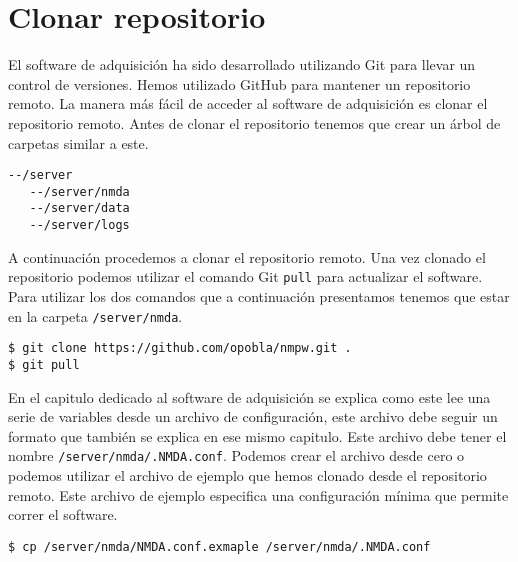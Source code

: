 	\section{Clonar repositorio}
		El software de adquisición ha sido desarrollado utilizando Git para llevar un control de versiones. Hemos utilizado GitHub para
		mantener un repositorio remoto. La manera más fácil de acceder al software de adquisición es clonar el repositorio remoto. Antes de
		clonar el repositorio tenemos que crear un árbol de carpetas similar a este.
		\begin{lstlisting}[style=myBash]
--/server
   --/server/nmda
   --/server/data
   --/server/logs
		\end{lstlisting}
		A continuación procedemos a clonar el repositorio remoto. Una vez clonado el repositorio podemos utilizar el comando Git \texttt{pull}
		para actualizar el software. Para utilizar los dos comandos que a continuación presentamos tenemos que estar en la carpeta
		\texttt{/server/nmda}.
		\begin{lstlisting}[style=myBash]
$ git clone https://github.com/opobla/nmpw.git .
$ git pull
		\end{lstlisting}
		En el capitulo dedicado al software de adquisición se explica como este lee una serie de variables desde un archivo de configuración,
		este archivo debe seguir un formato que también se explica en ese mismo capitulo. Este archivo debe tener el nombre
		\texttt{/server/nmda/.NMDA.conf}. Podemos crear el archivo desde cero o podemos utilizar el archivo de ejemplo que hemos clonado desde
		el repositorio remoto. Este archivo de ejemplo especifica una configuración mínima que permite correr el software. 
		\begin{lstlisting}[style=myBash]
$ cp /server/nmda/NMDA.conf.exmaple /server/nmda/.NMDA.conf
		\end{lstlisting}
